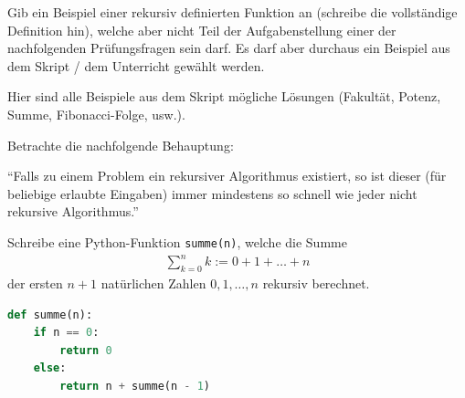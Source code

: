 \begin{questions}


Gib ein Beispiel einer rekursiv definierten Funktion an (schreibe die vollständige Definition hin), welche aber nicht Teil der Aufgabenstellung einer der nachfolgenden Prüfungsfragen sein darf.
Es darf aber durchaus ein Beispiel aus dem Skript / dem Unterricht gewählt werden.
\begin{solution}
  Hier sind alle Beispiele aus dem Skript mögliche Lösungen (Fakultät, Potenz, Summe, Fibonacci-Folge, usw.).
\end{solution}


Betrachte die nachfolgende Behauptung:
\begin{center}
  \enquote{Falls zu einem Problem ein rekursiver Algorithmus existiert, so ist dieser (für beliebige erlaubte Eingaben) immer mindestens so schnell wie jeder nicht rekursive Algorithmus.}
\end{center}
\droptotalpoints


Schreibe eine Python-Funktion \lstinline|summe(n)|, welche die Summe
\begin{align*}
    \sum_{k=0}^n k := 0 + 1 + \ldots + n
\end{align*}
der ersten $n+1$ natürlichen Zahlen $0,1,\ldots ,n$ rekursiv berechnet.
\begin{solution}
\begin{lstlisting}[language=Python,caption=rekursive Berechnung einer Summe,numbers=none]
def summe(n):
    if n == 0:
        return 0
    else:
        return n + summe(n - 1)
\end{lstlisting}
\end{solution}



\end{questions}
